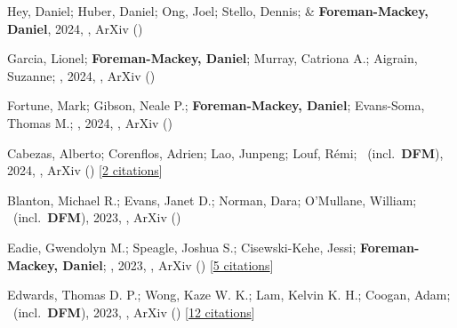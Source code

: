 \item[{\color{numcolor}\scriptsize14}] Hey, Daniel; Huber, Daniel; Ong, Joel; Stello, Dennis; \& \textbf{Foreman-Mackey, Daniel}, 2024, , ArXiv ()

\item[{\color{numcolor}\scriptsize13}] Garcia, Lionel; \textbf{Foreman-Mackey, Daniel}; Murray, Catriona A.; Aigrain, Suzanne; \etal, 2024, , ArXiv ()

\item[{\color{numcolor}\scriptsize12}] Fortune, Mark; Gibson, Neale P.; \textbf{Foreman-Mackey, Daniel}; Evans-Soma, Thomas M.; \etal, 2024, , ArXiv ()

\item[{\color{numcolor}\scriptsize11}] Cabezas, Alberto; Corenflos, Adrien; Lao, Junpeng; Louf, R{\'e}mi; \etal\ (incl.\ \textbf{DFM}), 2024, , ArXiv () [\href{https://ui.adsabs.harvard.edu/abs/2024arXiv240210797C}{2 citations}]

\item[{\color{numcolor}\scriptsize10}] Blanton, Michael R.; Evans, Janet D.; Norman, Dara; O'Mullane, William; \etal\ (incl.\ \textbf{DFM}), 2023, , ArXiv ()

\item[{\color{numcolor}\scriptsize9}] Eadie, Gwendolyn M.; Speagle, Joshua S.; Cisewski-Kehe, Jessi; \textbf{Foreman-Mackey, Daniel}; \etal, 2023, , ArXiv () [\href{https://ui.adsabs.harvard.edu/abs/2023arXiv230204703E}{5 citations}]

\item[{\color{numcolor}\scriptsize8}] Edwards, Thomas D. P.; Wong, Kaze W. K.; Lam, Kelvin K. H.; Coogan, Adam; \etal\ (incl.\ \textbf{DFM}), 2023, , ArXiv () [\href{https://ui.adsabs.harvard.edu/abs/2023arXiv230205329E}{12 citations}]

